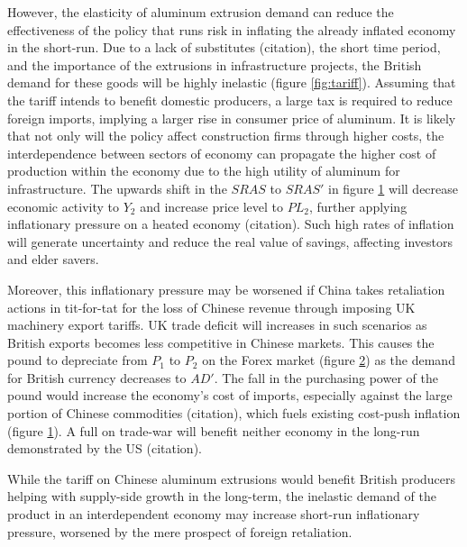 \documentclass[a4paper,12pt]{article}
\newcommand{\tikzfig}[1]{}
\begin{document}
\begin{figure}[H]
    \centering
    \tikzfig{assets/eco.txt}
    \caption{}
    \label{fig:eco}
\end{figure}
However, the elasticity of aluminum extrusion demand can reduce the effectiveness of the policy that runs risk in inflating the already inflated economy in the short-run. Due to a lack of substitutes (citation), the short time period, and the importance of the extrusions in infrastructure projects, the British demand for these goods will be highly inelastic (figure \ref{fig:tariff}).
Assuming that the tariff intends to benefit domestic producers, a large tax is required to reduce foreign imports, implying a larger rise in consumer price of aluminum. It is likely that not only will the policy affect construction firms through higher costs, the interdependence between sectors of economy can propagate the higher cost of production within the economy due to the high utility of aluminum for infrastructure. The upwards shift in the $SRAS$ to $SRAS'$ in figure \ref{fig:eco} will decrease economic activity to $Y_2$ and increase price level to $PL_2$, further applying inflationary pressure on a heated economy (citation). Such high rates of inflation will generate uncertainty and reduce the real value of savings, affecting investors and elder savers.



\begin{figure}[H]
    \centering
    \tikzfig{assets/forex.txt}
    \caption{}
    \label{fig:forex}
\end{figure}

Moreover, this inflationary pressure may be worsened if China takes retaliation actions in tit-for-tat for the loss of Chinese revenue through imposing UK machinery export tariffs. UK trade deficit will increases in such scenarios as British exports becomes less competitive in Chinese markets. This causes the pound to depreciate from $P_1$ to $P_2$ on the Forex market (figure \ref{fig:forex}) as the demand for British currency decreases to $AD'$. The fall in the purchasing power of the pound would increase the economy's cost of imports, especially against the large portion of Chinese commodities (citation), which fuels existing cost-push inflation (figure \ref{fig:eco}). A full on trade-war will benefit neither economy in the long-run demonstrated by the US (citation).

While the tariff on Chinese aluminum extrusions would benefit British producers helping with supply-side growth in the long-term, the inelastic demand of the product in an interdependent economy may increase short-run inflationary pressure, worsened by the mere prospect of foreign retaliation.
\end{document}
